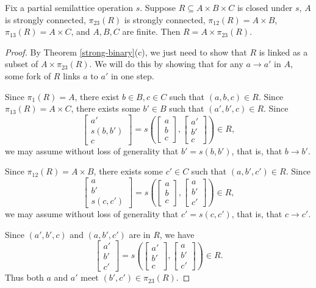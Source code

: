 \begin{thm}\label{strong-ternary} Fix a partial semilattice operation $s$. Suppose $R \subseteq A \times B \times C$ is closed under $s$, $A$ is strongly connected, $\pi_{23}(R)$ is strongly connected, $\pi_{12}(R) = A \times B$, $\pi_{13}(R) = A\times C$, and $A,B,C$ are finite. Then $R = A \times \pi_{23}(R)$.
\end{thm}
\begin{proof} By Theorem \ref{strong-binary}(c), we just need to show that $R$ is linked as a subset of $A \times \pi_{23}(R)$. We will do this by showing that for any $a \rightarrow a'$ in $A$, some fork of $R$ links $a$ to $a'$ in one step.

Since $\pi_1(R) = A$, there exist $b \in B, c \in C$ such that $(a,b,c) \in R$. Since $\pi_{13}(R) = A\times C$, there exists some $b' \in B$ such that $(a',b',c) \in R$. Since
\[
\begin{bmatrix} a'\\ s(b,b')\\ c\end{bmatrix} = s\left(\begin{bmatrix} a\\ b\\ c\end{bmatrix}, \begin{bmatrix} a'\\ b'\\ c\end{bmatrix}\right) \in R,
\]
we may assume without loss of generality that $b' = s(b,b')$, that is, that $b \rightarrow b'$.

Since $\pi_{12}(R) = A\times B$, there exists some $c' \in C$ such that $(a,b',c') \in R$. Since
\[
\begin{bmatrix} a\\ b'\\ s(c,c')\end{bmatrix} = s\left(\begin{bmatrix} a\\ b\\ c\end{bmatrix}, \begin{bmatrix} a\\ b'\\ c'\end{bmatrix}\right) \in R,
\]
we may assume without loss of generality that $c' = s(c,c')$, that is, that $c \rightarrow c'$.

Since $(a',b',c)$ and $(a,b',c')$ are in $R$, we have
\[
\begin{bmatrix} a'\\ b'\\ c'\end{bmatrix} = s\left(\begin{bmatrix} a'\\ b'\\ c\end{bmatrix}, \begin{bmatrix} a\\ b'\\ c'\end{bmatrix}\right) \in R.
\]
Thus both $a$ and $a'$ meet $(b',c') \in \pi_{23}(R)$.
\end{proof}

